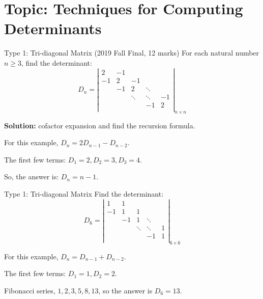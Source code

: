 \documentclass{beamer}
\begin{document}
\section{Topic: Techniques for Computing Determinants}
\begin{frame}{Type 1: Tri-diagonal Matrix}
(2019 Fall Final, 12 marks) For each natural number $n\geqslant 3$, find the determinant:
\begin{equation*}
    D_n=\left| \begin{matrix}
        2&		-1&		&		&		\\
        -1&		2&		-1&		&		\\
        &		-1&		2&		\ddots&		\\
        &		&		\ddots&		\ddots&		-1\\
        &		&		&		-1&		2\\
    \end{matrix} \right|_{n\times n}
\end{equation*}

\textbf{Solution:} cofactor expansion and find the recursion formula.

\vspace{3pt}
For this example, $D_n=2D_{n-1}-D_{n-2}$.

\vspace{3pt}
The first few terms: $D_1=2, D_2=3, D_3=4$.

\vspace{3pt}
So, the answer is: $D_n=n-1$.
\end{frame}

\begin{frame}{Type 1: Tri-diagonal Matrix}
Find the determinant:
\begin{equation*}
    D_6=\left| \begin{matrix}
        1&		1&		&		&		\\
        -1&		1&		1&		&		\\
        &		-1&		1&		\ddots&		\\
        &		&		\ddots&		\ddots&		1\\
        &		&		&		-1&		1\\
    \end{matrix} \right|_{6\times 6}
\end{equation*}

\vspace{3pt}
For this example, $D_n=D_{n-1}+D_{n-2}$.

\vspace{3pt}
The first few terms: $D_1=1, D_2=2$.

\vspace{3pt}
Fibonacci series, $1,2,3,5,8,13$, so the answer is $D_6=13$.
\end{frame}
\end{document}
